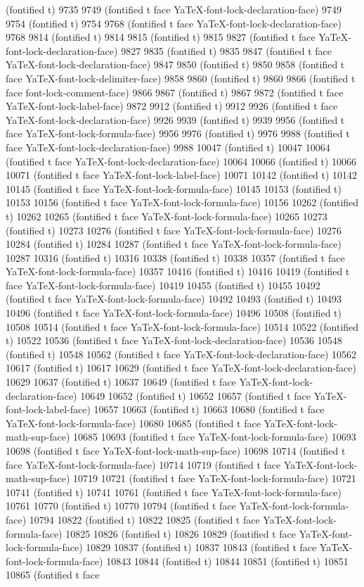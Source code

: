 (fontified t) 9735 9749 (fontified t face YaTeX-font-lock-declaration-face) 9749 9754 (fontified t) 9754 9768 (fontified t face YaTeX-font-lock-declaration-face) 9768 9814 (fontified t) 9814 9815 (fontified t) 9815 9827 (fontified t face YaTeX-font-lock-declaration-face) 9827 9835 (fontified t) 9835 9847 (fontified t face YaTeX-font-lock-declaration-face) 9847 9850 (fontified t) 9850 9858 (fontified t face YaTeX-font-lock-delimiter-face) 9858 9860 (fontified t) 9860 9866 (fontified t face font-lock-comment-face) 9866 9867 (fontified t) 9867 9872 (fontified t face YaTeX-font-lock-label-face) 9872 9912 (fontified t) 9912 9926 (fontified t face YaTeX-font-lock-declaration-face) 9926 9939 (fontified t) 9939 9956 (fontified t face YaTeX-font-lock-formula-face) 9956 9976 (fontified t) 9976 9988 (fontified t face YaTeX-font-lock-declaration-face) 9988 10047 (fontified t) 10047 10064 (fontified t face YaTeX-font-lock-declaration-face) 10064 10066 (fontified t) 10066 10071 (fontified t face YaTeX-font-lock-label-face) 10071 10142 (fontified t) 10142 10145 (fontified t face YaTeX-font-lock-formula-face) 10145 10153 (fontified t) 10153 10156 (fontified t face YaTeX-font-lock-formula-face) 10156 10262 (fontified t) 10262 10265 (fontified t face YaTeX-font-lock-formula-face) 10265 10273 (fontified t) 10273 10276 (fontified t face YaTeX-font-lock-formula-face) 10276 10284 (fontified t) 10284 10287 (fontified t face YaTeX-font-lock-formula-face) 10287 10316 (fontified t) 10316 10338 (fontified t) 10338 10357 (fontified t face YaTeX-font-lock-formula-face) 10357 10416 (fontified t) 10416 10419 (fontified t face YaTeX-font-lock-formula-face) 10419 10455 (fontified t) 10455 10492 (fontified t face YaTeX-font-lock-formula-face) 10492 10493 (fontified t) 10493 10496 (fontified t face YaTeX-font-lock-formula-face) 10496 10508 (fontified t) 10508 10514 (fontified t face YaTeX-font-lock-formula-face) 10514 10522 (fontified t) 10522 10536 (fontified t face YaTeX-font-lock-declaration-face) 10536 10548 (fontified t) 10548 10562 (fontified t face YaTeX-font-lock-declaration-face) 10562 10617 (fontified t) 10617 10629 (fontified t face YaTeX-font-lock-declaration-face) 10629 10637 (fontified t) 10637 10649 (fontified t face YaTeX-font-lock-declaration-face) 10649 10652 (fontified t) 10652 10657 (fontified t face YaTeX-font-lock-label-face) 10657 10663 (fontified t) 10663 10680 (fontified t face YaTeX-font-lock-formula-face) 10680 10685 (fontified t face YaTeX-font-lock-math-sup-face) 10685 10693 (fontified t face YaTeX-font-lock-formula-face) 10693 10698 (fontified t face YaTeX-font-lock-math-sup-face) 10698 10714 (fontified t face YaTeX-font-lock-formula-face) 10714 10719 (fontified t face YaTeX-font-lock-math-sup-face) 10719 10721 (fontified t face YaTeX-font-lock-formula-face) 10721 10741 (fontified t) 10741 10761 (fontified t face YaTeX-font-lock-formula-face) 10761 10770 (fontified t) 10770 10794 (fontified t face YaTeX-font-lock-formula-face) 10794 10822 (fontified t) 10822 10825 (fontified t face YaTeX-font-lock-formula-face) 10825 10826 (fontified t) 10826 10829 (fontified t face YaTeX-font-lock-formula-face) 10829 10837 (fontified t) 10837 10843 (fontified t face YaTeX-font-lock-formula-face) 10843 10844 (fontified t) 10844 10851 (fontified t) 10851 10865 (fontified t face 
